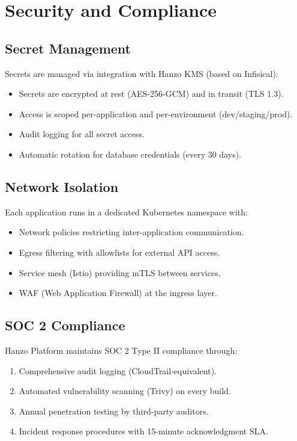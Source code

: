 \documentclass[11pt,twocolumn]{article}
\begin{document}
\section{Security and Compliance}
\label{sec:security}

\subsection{Secret Management}

Secrets are managed via integration with Hanzo KMS (based on Infisical):

\begin{itemize}[leftmargin=1.1em]
    \item Secrets are encrypted at rest (AES-256-GCM) and in transit (TLS 1.3).
    \item Access is scoped per-application and per-environment (dev/staging/prod).
    \item Audit logging for all secret access.
    \item Automatic rotation for database credentials (every 30 days).
\end{itemize}

\subsection{Network Isolation}

Each application runs in a dedicated Kubernetes namespace with:
\begin{itemize}[leftmargin=1.1em]
    \item Network policies restricting inter-application communication.
    \item Egress filtering with allowlists for external API access.
    \item Service mesh (Istio) providing mTLS between services.
    \item WAF (Web Application Firewall) at the ingress layer.
\end{itemize}

\subsection{SOC 2 Compliance}

Hanzo Platform maintains SOC 2 Type II compliance through:
\begin{enumerate}[leftmargin=1.4em]
    \item Comprehensive audit logging (CloudTrail-equivalent).
    \item Automated vulnerability scanning (Trivy) on every build.
    \item Annual penetration testing by third-party auditors.
    \item Incident response procedures with 15-minute acknowledgment SLA.
\end{enumerate}
\end{document}

